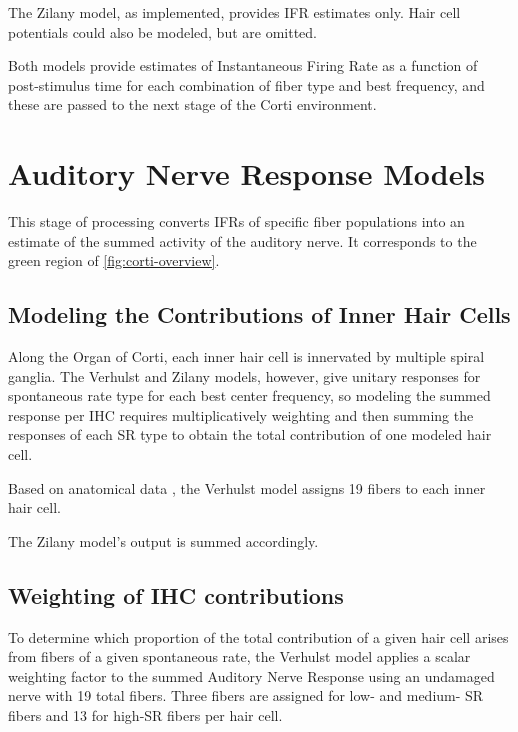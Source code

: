The Zilany model, as implemented, provides IFR estimates only.  Hair cell potentials could also be modeled, but are omitted.

Both models provide estimates of Instantaneous Firing Rate as a function of post-stimulus time for each combination of fiber type and best frequency, and these are passed to the next stage of the Corti environment.


\section{Auditory Nerve Response Models} %
\label{sec:auditory_nerve_response_models}
This stage of processing converts IFRs of specific fiber populations into an estimate of the summed activity of the auditory nerve. It corresponds to the green region of \autoref{fig:corti-overview}. 

\subsection{Modeling the Contributions of Inner Hair Cells} %
\label{sub:contributions_to_the_response_by_inner_hair_cells}
Along the Organ of Corti, each inner hair cell is innervated by multiple spiral ganglia.  The Verhulst and Zilany models, however, give unitary responses for spontaneous rate type for each best center frequency, so modeling the summed response per IHC requires multiplicatively weighting and then summing the responses of each SR type to obtain the total contribution of one modeled hair cell. 

Based on anatomical data \citep{Liberman1978AuditoryNerve}, the Verhulst model assigns 19 fibers to each inner hair cell.  

The Zilany model's output is summed accordingly. 
\subsection{Weighting of IHC contributions} %
\label{sub:weighting_of_ihc_contribution}
To determine which proportion of the total contribution of a given hair cell arises from fibers of a given spontaneous rate, the Verhulst model applies a scalar weighting factor to the summed Auditory Nerve Response using an undamaged nerve with 19 total fibers. Three fibers are assigned for low- and medium- SR fibers and 13 for high-SR fibers per hair cell. 

